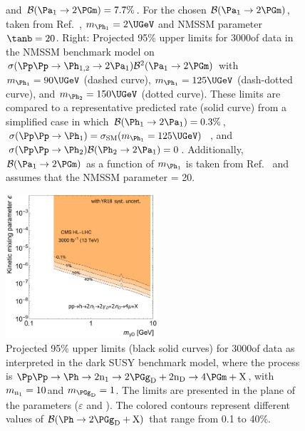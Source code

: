 \begin{figure}
{and $\mathcal{B}(\PaOne \to 2\PGm) = 7.7\%$. For the chosen $\mathcal{B}(\PaOne \to 2\PGm)$, taken from Ref.~\cite{Dermisek:2010mg}, $\MPhOne = 2\UGeV$ and NMSSM parameter $\tanb = 20$. Right: Projected 95\% \CL upper limits for 3000\fbinv of data in the NMSSM benchmark model on $\sigma(\Pp\Pp \to \PhOneTwo \to 2 \PaOne) \mathcal{B}^2(\PaOne \to 2 \PGm)$ with $\MPhOne=90\UGeV$ (dashed curve),
$\MPhOne=125\UGeV$ (dash-dotted curve), and $\MPhTwo=150\UGeV$ (dotted curve). These limits are compared to a representative predicted rate (solid curve) from a simplified case in which $\mathcal{B}(\PhOne \to 2 \PaOne) = 0.3\%$,
$\sigma (\Pp\Pp \to \PhOne)=\sigma_\mathrm{SM}(\MPhOne = 125\UGeV)$~\cite{Dittmaier:2011ti}, and
$\sigma (\Pp\Pp \to \PhTwo)  \mathcal{B}(\PhTwo \to 2 \PaOne) = 0$. Additionally, $\mathcal{B}(\PaOne \to 2\PGm)$
as a function of $\MPhOne$ is taken from Ref.~\cite{Dermisek:2010mg} and assumes that the NMSSM parameter \tanb = 20.}
\label{fig:my_label2}
\end{figure}

\begin{figure}
\centering
\includegraphics[width=0.5\textwidth]{plots/darksusy_plots_scenario_2/Limit_DarkPhoton_Epsilon_vs_mass_FTR_scenario2.pdf}%
\caption{Projected 95\% \CL upper limits (black solid curves) for 3000\fbinv of data as interpreted in the dark SUSY benchmark model, where the process is $\Pp\Pp \to \Ph \to 2\nOne \to 2\gammaDark+2\nDark \to  4\PGm+\PX$, with $m_{\textnormal{n}_{1}}=10$\UGeV and $\MgammaDark=1$\UGeV.
The limits are presented in the plane of the parameters ($\varepsilon$ and \MgammaDark). The colored contours represent different values of $\mathcal{B}(\Ph \to 2\gammaDark + \PX)$ that range from 0.1 to 40\%. }
\label{fig:my_label4}
\end{figure}


